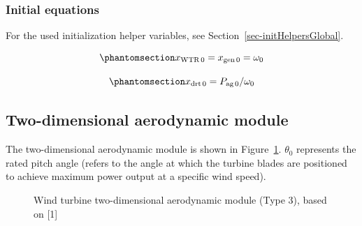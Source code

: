 \documentclass[
  a4paper,
  DIV=11,
  numbers=noendperiod]{scrartcl}
\begin{document}
\subsubsection{Initial equations}\label{initial-equations-2}

For the used initialization helper variables, see
Section~\ref{sec-initHelpersGlobal}.

\begin{equation}\phantomsection\label{eq-initXwtr}{
x_\mathrm{WTR\,0} = x_\mathrm{gen\,0} = \omega_0
}\end{equation}

\begin{equation}\phantomsection\label{eq-initXdrt}{
x_\mathrm{drt\,0} = P_\mathrm{ag\,0} / \omega_0
}\end{equation}

\subsection{Two-dimensional aerodynamic module}\label{sec-aerodynamic2d}

The two-dimensional aerodynamic module is shown in
Figure~\ref{fig-wtAerodynamic}. \(\theta_0\) represents the rated pitch
angle (refers to the angle at which the turbine blades are positioned to
achieve maximum power output at a specific wind speed).

\begin{figure}


\caption{\label{fig-wtAerodynamic}Wind turbine two-dimensional
aerodynamic module (Type 3), based on {[}1{]}}

\end{figure}%
\end{document}
